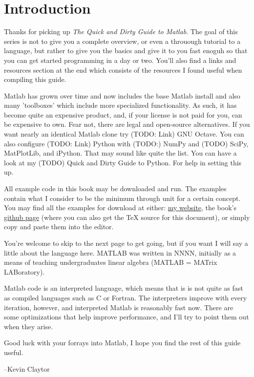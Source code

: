 
\pagebreak
\section{Introduction}

Thanks for picking up \emph{The Quick and Dirty Guide to Matlab}. 
The goal of this series is not to give you a complete overview, or even a throuough tutorial to a language,
 but rather to give you the basics and give it to you fast enoguh so that you can get started programming in a day or two. 
You'll also find a links and resources section at the end which consists of the resources I found useful when compiling this guide.

Matlab has grown over time and now includes the base Matlab install and also many 'toolboxes' which include more specialized functionality.
 As such, it has become quite an expensive product, and, if your license is not paid for you, can be expensive to own.
 Fear not, there are legal and open-source alternatives.
 If you want nearly an identical Matlab clone try (TODO: Link) GNU Octave.
 You can also configure (TODO: Link) Python with (TODO:) NumPy and (TODO) SciPy, MatPlotLib, and iPython.
 That may sound like quite the list. You can have a look at my (TODO) Quick and Dirty Guide to Python. For help in setting this up.

All example code in this book may be downloaded and run. The examples contain what I consider to be the minimum through unit for a certain concept.
You may find all the examples for download at either:
 \href{http://people.duke.edu/~kec30/}{my website}, the book's
 \href{https://github.com/KEClaytor/QuickDirtyMatlab}{github page} (where you can also get the TeX source for this document),
 or simply copy and paste them into the editor.

You're welcome to skip to the next page to get going, but if you want I will say a little about the language here.
MATLAB was written in NNNN, initially as a means of teaching undergraduates linear algebra (MATLAB = MATrix LABoratory).

Matlab code is an interpreted language, which means that is is not quite as fast as compiled languages such as C or Fortran.
 The interpreters improve with every iteration, however, and interpreted Matlab is reasonably fast now.
 There are some optimizations that help improve performance, and I'll try to point them out when they arise.

Good luck with your forrays into Matlab, I hope you find the rest of this guide useful.

    --Kevin Claytor

